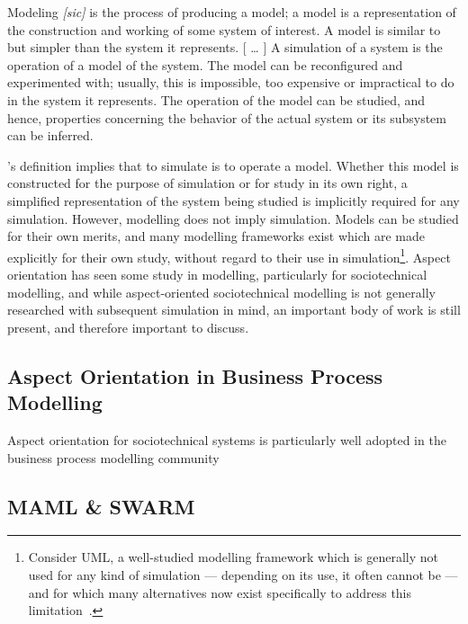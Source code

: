 \begin{displayquote}
    Modeling \emph{[sic]} is the process of producing a model; a model
    is a representation of the construction and working of
    some system of interest. A model is similar to but
    simpler than the system it represents.
    \newline{}
    [ \ldots{} ]
    \newline{}
    A simulation of a system is the operation of a model of the system. The
    model can be reconfigured and experimented with; usually, this is
    impossible, too expensive or impractical to do in the system it represents.
    The operation of the model can be studied, and hence, properties concerning
    the behavior of the actual system or its subsystem can be inferred.
\end{displayquote}

\citeauthor{smintro}'s definition implies that to simulate is to operate a
model. Whether this model is constructed for the purpose of simulation or for
study in its own right, a simplified representation of the system being studied
is implicitly required for any simulation. However, modelling does not imply
simulation. Models can be studied for their own merits, and many modelling
frameworks exist which are made explicitly for their own study, without regard
to their use in simulation\footnote{Consider UML, a well-studied modelling
framework which is generally not used for any kind of simulation --- depending
on its use, it often cannot be --- and for which many alternatives now exist
specifically to address this
limitation~\cite{opm_original,ExecutableBPMNMitsyuk}.}. Aspect orientation has seen some study in modelling,
particularly for sociotechnical modelling, and while aspect-oriented
sociotechnical modelling is not generally researched with subsequent simulation
in mind, an important body of work is still present, and therefore important to
discuss.

\subsection{Aspect Orientation in Business Process Modelling}
Aspect orientation for sociotechnical systems is particularly well adopted in
the business process modelling community\cite{Machado_2011,}


\subsection{MAML \& SWARM}


